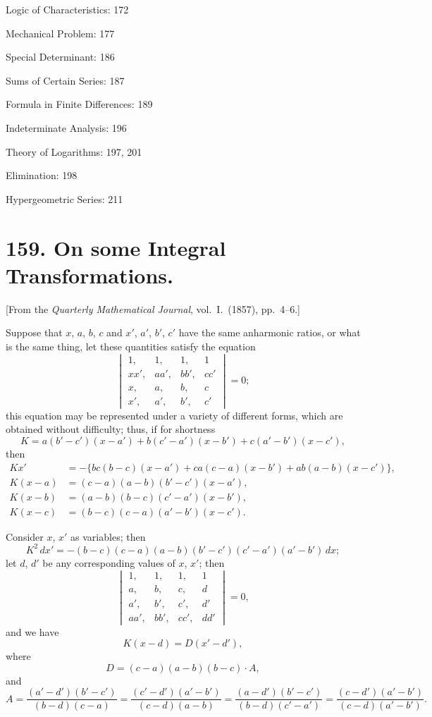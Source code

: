 \documentclass[11pt,a4paper]{book}
\begin{document}
Logic of Characteristics: 172

Mechanical Problem: 177

Special Determinant: 186

Sums of Certain Series: 187

Formula in Finite Differences: 189

Indeterminate Analysis: 196

Theory of Logarithms: 197, 201

Elimination: 198

Hypergeometric Series: 211

\clearpage

\section*{159. On some Integral Transformations.}

[From the \textit{Quarterly Mathematical Journal}, vol.~I.\ (1857), pp.~4--6.]

Suppose that $x$, $a$, $b$, $c$ and $x'$, $a'$, $b'$, $c'$ have the same anharmonic ratios, or what is the same thing, let these quantities satisfy the equation
\[
\begin{vmatrix}
1, & 1, & 1, & 1 \\
xx', & aa', & bb', & cc' \\
x, & a, & b, & c \\
x', & a', & b', & c'
\end{vmatrix}
= 0;
\]
this equation may be represented under a variety of different forms, which are obtained without difficulty; thus, if for shortness
\[
K = a(b'-c')(x-a') + b(c'-a')(x-b') + c(a'-b')(x-c'),
\]
then
\begin{align*}
Kx' &= -\{bc(b-c)(x-a') + ca(c-a)(x-b') + ab(a-b)(x-c')\}, \\
K(x-a) &= (c-a)(a-b)(b'-c')(x-a'), \\
K(x-b) &= (a-b)(b-c)(c'-a')(x-b'), \\
K(x-c) &= (b-c)(c-a)(a'-b')(x-c').
\end{align*}

Consider $x$, $x'$ as variables; then
\[
K^2 \, dx' = -(b-c)(c-a)(a-b)(b'-c')(c'-a')(a'-b') \, dx;
\]
let $d$, $d'$ be any corresponding values of $x$, $x'$; then
\[
\begin{vmatrix}
1, & 1, & 1, & 1 \\
a, & b, & c, & d \\
a', & b', & c', & d' \\
aa', & bb', & cc', & dd'
\end{vmatrix}
= 0,
\]
and we have
\[
K(x-d) = D(x'-d'),
\]
where
\[
D = (c-a)(a-b)(b-c) \cdot A,
\]
and
\[
A = \frac{(a'-d')(b'-c')}{(b-d)(c-a)} = \frac{(c'-d')(a'-b')}{(c-d)(a-b)} = \frac{(a-d')(b'-c')}{(b-d)(c'-a')} = \frac{(c-d')(a'-b')}{(c-d)(a'-b')}.
\]
\end{document}
